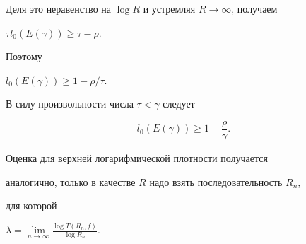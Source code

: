 Деля это неравенство на $\log R$ и устремляя $R\to\infty$, получаем


$\tau l_0(E(\gamma))\ge \tau-\rho$.


Поэтому


$l_0 (E(\gamma))\ge 1-{\rho}/{\tau}$.


В силу произвольности числа $\tau<\gamma$ следует


$$


l_0(E(\gamma))\ge 1-\frac{\rho}{\gamma}.


$$





Оценка для верхней логарифмической плотности получается


аналогично, только в качестве $R$ надо взять последовательность $R_n$, 


для которой 


$\lambda=\lim\limits_{n\to\infty}\frac{\log T(R_n,f)}{\log R_n}$.








